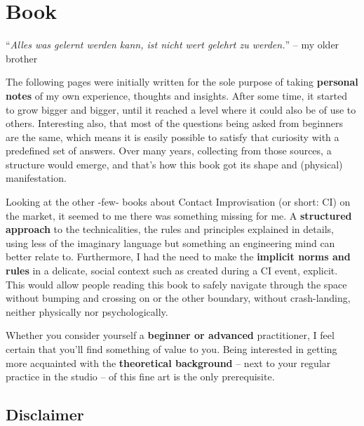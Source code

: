 \section{Book}\label{sec:book}

\begin{displayquote}
    ``\textit{Alles was gelernt werden kann, ist nicht wert gelehrt zu werden.}'' -- my older brother
\end{displayquote}

The following pages were initially written for the sole purpose of taking \textbf{personal notes} of my own experience, thoughts and insights.
After some time, it started to grow bigger and bigger, until it reached a level where it could also be of use to others.
Interesting also, that most of the questions being asked from beginners are the same, which means it is easily possible to satisfy that curiosity with a predefined set of answers.
Over many years, collecting from those sources, a structure would emerge, and that's how this book got its shape and (physical) manifestation.

Looking at the other -few- books about Contact Improvisation (or short: CI) on the market, it seemed to me there was something missing for me.
A \textbf{structured approach} to the technicalities, the rules and principles explained in details, using less of the imaginary language but something an engineering mind can better relate to.
Furthermore, I had the need to make the \textbf{implicit norms and rules} in a delicate, social context such as created during a CI event, explicit.
This would allow people reading this book to safely navigate through the space without bumping and crossing on or the other boundary, without crash-landing, neither physically nor psychologically.

Whether you consider yourself a \textbf{beginner or advanced} practitioner, I feel certain that you'll find something of value to you.
Being interested in getting more acquainted with the \textbf{theoretical background} -- next to your regular practice in the studio -- of this fine art is the only prerequisite.

\subsection{Disclaimer}\label{subsec:disclaimer}

